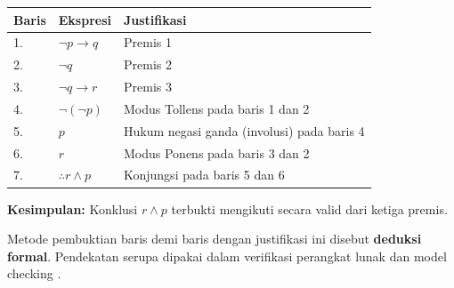 \begin{table}[H]
\centering
\small
\begin{tabular}{|p{1.0cm}|p{3.1cm}|p{6.8cm}|}
\hline
\textbf{Baris} & \textbf{Ekspresi} & \textbf{Justifikasi} \\
\hline
1. & $\neg p \rightarrow q$ & Premis 1 \\
2. & $\neg q$                 & Premis 2 \\
3. & $\neg q \rightarrow r$   & Premis 3 \\
\hline
4. & $\neg (\neg p)$          & Modus Tollens pada baris 1 dan 2 \\
5. & $p$                      & Hukum negasi ganda (involusi) pada baris 4 \\
6. & $r$                      & Modus Ponens pada baris 3 dan 2 \\
\hline
7. & \textbf{$\therefore r \land p$} & Konjungsi pada baris 5 dan 6 \\
\hline
\end{tabular}
\end{table}

\textbf{Kesimpulan:} Konklusi $r \land p$ terbukti mengikuti secara valid dari ketiga premis.

Metode pembuktian baris demi baris dengan justifikasi ini disebut \textbf{deduksi formal}. Pendekatan serupa dipakai dalam verifikasi perangkat lunak dan model checking \cite{wiki_first_order_logic}.
